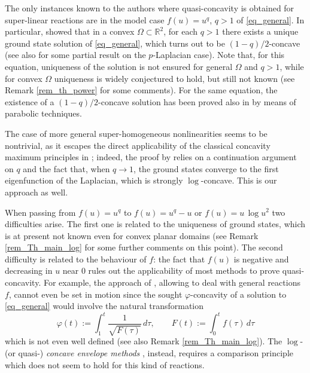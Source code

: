 \documentclass[12pt]{amsart}
\numberwithin{equation}{section}
\theoremstyle{plain}
\theoremstyle{plain}
\theoremstyle{plain}
\theoremstyle{definition}
\newcommand{\R}{{\mathbb R}}
\begin{document}
The only instances known to the authors where quasi-concavity is obtained for super-linear reactions are \cite{Lin94, LeVa08} in the model case $f(u)=u^q$, $q>1$ of \eqref{eq_general}. 
In particular, \cite{Lin94} showed that in a convex $\Omega \subset \R^2$, for each $q>1$ there exists a unique ground state solution of \eqref{eq_general}, which turns out to be $(1-q)/2$-concave (see also \cite{GaSq25} for some partial result on the $p$-Laplacian case). 
Note that, for this equation, uniqueness of the solution is not ensured for general $\Omega$ and $q>1$, while for convex $\Omega$ uniqueness is widely conjectured to hold, but still not known (see Remark \ref{rem_th_power} for some comments). 
For the same equation, the existence of a $(1-q)/2$-concave solution has been proved also in \cite[Corollary 4.7]{LeVa08} by means of parabolic techniques.
 
The case of more general super-homogeneous nonlinearities seems to be nontrivial, as it escapes the direct applicability of the classical concavity maximum principles in \cite{Kor83, Ken85}; indeed, the proof by \cite{Lin94} relies on a continuation argument on $q$ and the fact that, when $q\to 1$, the ground states converge to the first eigenfunction of the Laplacian, which is strongly $\log$-concave. This is our approach as well.

When passing from $f(u)=u^q$ to $f(u)=u^q-u$ or $f(u)=u\, \log u^2$ two difficulties arise.
The first one is related to the uniqueness of ground states, which is at present not known even for convex planar domains (see Remark \ref{rem_Th_main_log} for some further comments on this point). 
The second difficulty is related to the behaviour of $f$: the fact that $f(u)$ is negative and decreasing in $u$ near $0$ rules out the applicability of most methods to prove quasi-concavity. 
For example, the approach of \cite{BMS22, MRS24}, allowing to deal with general reactions $f$, cannot even be set in motion since the sought $\varphi$-concavity of a solution to \eqref{eq_general} would involve the natural transformation 
\begin{equation}\label{eq_transf_BMS}
\varphi(t):=\int_1^t \frac{1}{\sqrt{F(\tau)}}\, d\tau, \qquad F(t):=\int_0^t f(\tau) \, d \tau
\end{equation}
which is not even well defined (see also Remark \ref{rem_Th_main_log}). The $\log$- (or quasi-) \emph{concave envelope methods} \cite{ALL97, BiSa13, IsSa14}, instead, requires a comparison principle which does not seem to hold for this kind of reactions. 
\end{document}
